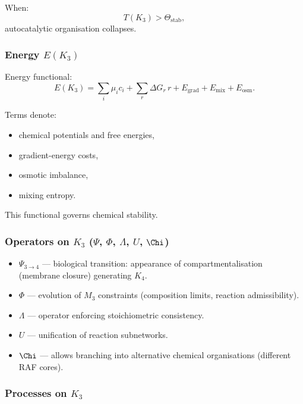 When:
\[
T(K_3) > \Theta_{\mathrm{stab}},
\]
autocatalytic organisation collapses.

\subsubsection{Energy \texorpdfstring{$E(K_3)$}{E(K_3)}}

Energy functional:
\[
E(K_3) =
\sum_i \mu_i c_i +
\sum_r \Delta G_r\, r +
E_{\mathrm{grad}} + E_{\mathrm{mix}} + E_{\mathrm{osm}}.
\]

Terms denote:
\begin{itemize}
    \item chemical potentials and free energies,
    \item gradient-energy costs,
    \item osmotic imbalance,
    \item mixing entropy.
\end{itemize}

This functional governs chemical stability.

\subsubsection{Operators on \texorpdfstring{$K_3$}{K_3} (\texorpdfstring{$\Psi$}{\Psi}, \texorpdfstring{$\Phi$}{\Phi}, \texorpdfstring{$\Lambda$}{\Lambda}, \texorpdfstring{$U$}{U}, \texorpdfstring{$\Chi$}{\Chi})}

\begin{itemize}
    \item $\Psi_{3\to4}$ — biological transition: appearance of
          compartmentalisation (membrane closure) generating $K_4$.
    \item $\Phi$ — evolution of $M_3$ constraints (composition limits,
          reaction admissibility).
    \item $\Lambda$ — operator enforcing stoichiometric consistency.
    \item $U$ — unification of reaction subnetworks.
    \item $\Chi$ — allows branching into alternative chemical
          organisations (different RAF cores).
\end{itemize}

\subsubsection{Processes on \texorpdfstring{$K_3$}{K_3}}

